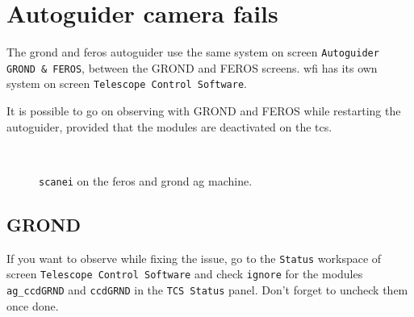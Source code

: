 \documentclass[11pt,fleqn]{book} %
\begin{document}
\section{Autoguider camera fails}
\label{sec:agfail}

The \gls{grond} and \gls{feros} autoguider use the same system on screen \texttt{Autoguider GROND \& FEROS}, between the GROND and FEROS screens.  \gls{wfi} has its own system on screen \texttt{Telescope Control Software}.

It is possible to go on observing with GROND and FEROS while restarting the autoguider, provided that the modules are deactivated on the \gls{tcs}.

\begin{figure}[t!]
\begin{minipage}{0.48\linewidth}
\\
\end{minipage}
\hspace{0.02\linewidth}
\begin{minipage}{0.48\linewidth}
\end{minipage}
\caption[Command scanei to control environments]{\texttt{scanei} on the \gls{feros} and \gls{grond} 
\gls{ag} machine.}
\label{fig:agscanei}
\end{figure}


\subsection{GROND}
If you want to observe while fixing the issue, go to the \texttt{Status} workspace of screen \texttt{Telescope Control Software} and check \texttt{ignore} for the modules \texttt{ag\_ccdGRND} and \texttt{ccdGRND} in the \texttt{TCS Status} panel.  Don't forget to uncheck them once done.
\end{document}
